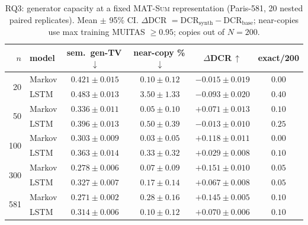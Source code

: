 \documentclass[sigconf,nonacm]{acmart}
\begin{document}
\begin{table}[t]
  \caption{RQ3: generator capacity at a fixed \textsc{MAT-Sum} representation (Paris-581, 20 nested
  paired replicates). Mean $\pm$ 95\% CI. $\Delta$DCR $=\mathrm{DCR}_{\text{synth}}-\mathrm{DCR}_{\text{base}}$;
  near-copies use max training MUITAS $\ge0.95$; copies out of $N{=}200$.}
  \label{tab:rq3}
  \small
  \begin{tabular}{@{}rlcccc@{}}
    \toprule
    $n$ & model & sem.\ gen-TV\,$\downarrow$ & near-copy \%\,$\downarrow$ & $\Delta$DCR\,$\uparrow$ & exact/200 \\
    \midrule
    \multirow{2}{*}{20}  & Markov & $\mathbf{0.421\pm0.015}$ & $\mathbf{0.10\pm0.12}$ & $\mathbf{-0.015\pm0.019}$ & $0.00$ \\
                         & LSTM   & $0.483\pm0.013$ & $3.50\pm1.33$ & $-0.093\pm0.020$ & $0.40$ \\
    \midrule
    \multirow{2}{*}{50}  & Markov & $\mathbf{0.336\pm0.011}$ & $\mathbf{0.05\pm0.10}$ & $\mathbf{+0.071\pm0.013}$ & $0.10$ \\
                         & LSTM   & $0.396\pm0.013$ & $0.50\pm0.39$ & $-0.013\pm0.010$ & $0.25$ \\
    \midrule
    \multirow{2}{*}{100} & Markov & $\mathbf{0.303\pm0.009}$ & $\mathbf{0.03\pm0.05}$ & $\mathbf{+0.118\pm0.011}$ & $0.00$ \\
                         & LSTM   & $0.363\pm0.014$ & $0.33\pm0.32$ & $+0.029\pm0.008$ & $0.10$ \\
    \midrule
    \multirow{2}{*}{300} & Markov & $\mathbf{0.278\pm0.006}$ & $0.07\pm0.09$ & $\mathbf{+0.151\pm0.010}$ & $0.05$ \\
                         & LSTM   & $0.327\pm0.007$ & $0.17\pm0.14$ & $+0.067\pm0.008$ & $0.05$ \\
    \midrule
    \multirow{2}{*}{581} & Markov & $\mathbf{0.271\pm0.002}$ & $0.28\pm0.16$ & $\mathbf{+0.145\pm0.005}$ & $0.10$ \\
                         & LSTM   & $0.314\pm0.006$ & $0.10\pm0.12$ & $+0.070\pm0.006$ & $0.10$ \\
    \bottomrule
  \end{tabular}
\end{table}
\end{document}
